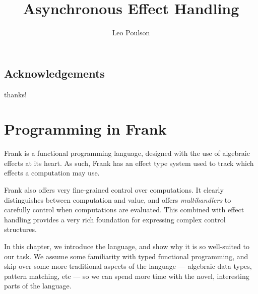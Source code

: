 \documentclass[msc,deptreport,cs]{infthesis} %
\begin{document}
\begin{preliminary}

\title{Asynchronous Effect Handling}

\author{Leo Poulson}


\maketitle

\section*{Acknowledgements}
thanks!

\tableofcontents

\end{preliminary}

\chapter{Programming in Frank}

Frank is a functional programming language, designed with the use of algebraic
effects at its heart. As such, Frank has an effect type system used to track
which effects a computation may use.

Frank also offers very fine-grained control over computations. It clearly
distinguishes between computation and value, and offers \emph{multihandlers} to
carefully control when computations are evaluated. This combined with effect
handling provides a very rich foundation for expressing complex control
structures.

In this chapter, we introduce the language, and show why it is so well-suited to
our task. We assume some familiarity with typed functional programming, and skip
over some more traditional aspects of the language --- algebraic data types,
pattern matching, etc --- so we can spend more time with the novel, interesting
parts of the language.
\end{document}
